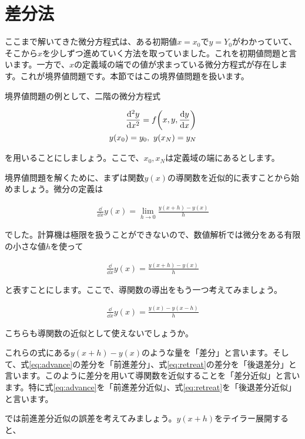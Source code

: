 \section{差分法}
\label{difference}
ここまで解いてきた微分方程式は、ある初期値$x=x_0$で$y=Y_0$がわかっていて、そこから$x$を少しずつ進めていく方法を取っていました。これを初期値問題と言います。一方で、$x$の定義域の端での値が求まっている微分方程式が存在します。これが境界値問題です。本節ではこの境界値問題を扱います。

境界値問題の例として、二階の微分方程式

\begin{eqnarray}
    \frac{\dd^2 y}{\dd x^2}=f\pqty{x,y,\frac{\dd y}{\dd x}} \\
    y(x_0)=y_0,\ y(x_N)=y_N
\end{eqnarray}

を用いることにしましょう。ここで、$x_0,x_N$は定義域の端にあるとします。

境界値問題を解くために、まずは関数$y(x)$の導関数を近似的に表すことから始めましょう。微分の定義は

\begin{eqnarray}
    \frac{\dd}{\dd x}y(x)=\lim_{h\rightarrow0}\frac{y(x+h)-y(x)}{h}
\end{eqnarray}

\noindent
でした。計算機は極限を扱うことができないので、数値解析では微分をある有限の小さな値$h$を使って

\begin{eqnarray}
    \frac{\dd}{\dd x}y(x)=\frac{y(x+h)-y(x)}{h}
    \label{eq:advance}
\end{eqnarray}

\noindent
と表すことにします。ここで、導関数の導出をもう一つ考えてみましょう。

\begin{eqnarray}
    \frac{\dd}{\dd x}y(x)=\frac{y(x)-y(x-h)}{h}
    \label{eq:retreat}
\end{eqnarray}

\noindent
こちらも導関数の近似として使えないでしょうか。

これらの式にある$y(x+h)-y(x)$のような量を「差分」と言います。そして、式\ref{eq:advance}の差分を「前進差分」、式\ref{eq:retreat}の差分を「後退差分」と言います。このように差分を用いて導関数を近似することを「差分近似」と言います。特に式\ref{eq:advance}を「前進差分近似」、式\ref{eq:retreat}を「後退差分近似」と言います。

では前進差分近似の誤差を考えてみましょう。$y(x+h)$をテイラー展開すると、

